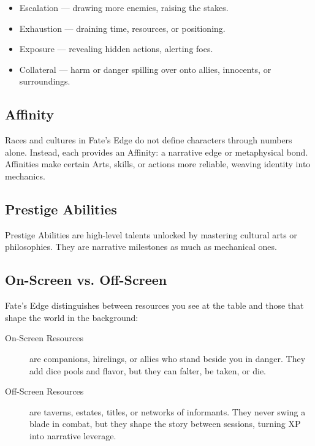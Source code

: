 \begin{itemize}
\item Escalation --- drawing more enemies, raising the stakes.
\item Exhaustion --- draining time, resources, or positioning.
\item Exposure --- revealing hidden actions, alerting foes.
\item Collateral --- harm or danger spilling over onto allies, innocents, or surroundings.
\end{itemize}

\subsection{Affinity}

Races and cultures in Fate's Edge do not define characters through numbers alone. Instead, each provides an Affinity: a narrative edge or metaphysical bond. Affinities make certain Arts, skills, or actions more reliable, weaving identity into mechanics.

\subsection{Prestige Abilities}

Prestige Abilities are high-level talents unlocked by mastering cultural arts or philosophies. They are narrative milestones as much as mechanical ones.

\subsection{On-Screen vs. Off-Screen}

Fate's Edge distinguishes between resources you see at the table and those that shape the world in the background:

\begin{description}
\item[On-Screen Resources] are companions, hirelings, or allies who stand beside you in danger. They add dice pools and flavor, but they can falter, be taken, or die.
\item[Off-Screen Resources] are taverns, estates, titles, or networks of informants. They never swing a blade in combat, but they shape the story between sessions, turning XP into narrative leverage.
\end{description}

